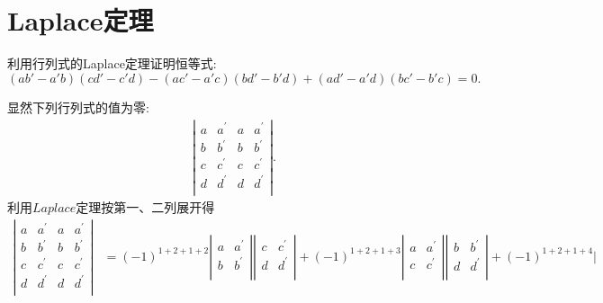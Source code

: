 \documentclass[../../main.tex]{subfiles}
\begin{document}
\section{Laplace定理}

\begin{example}
利用行列式的Laplace定理证明恒等式:
\[
(ab' - a'b)(cd' - c'd)-(ac' - a'c)(bd' - b'd)+(ad' - a'd)(bc' - b'c)=0.
\]
\end{example}
\begin{solution}
显然下列行列式的值为零:
\begin{align*}
\left| \begin{matrix}
a&		a^{\prime}&		a&		a^{\prime}\\
b&		b^{\prime}&		b&		b^{\prime}\\
c&		c^{\prime}&		c&		c^{\prime}\\
d&		d^{\prime}&		d&		d^{\prime}\\
\end{matrix} \right|.
\end{align*}
利用$Laplace$定理按第一、二列展开得
\begin{align*}
\left| \begin{matrix}
a&		a^{\prime}&		a&		a^{\prime}\\
b&		b^{\prime}&		b&		b^{\prime}\\
c&		c^{\prime}&		c&		c^{\prime}\\
d&		d^{\prime}&		d&		d^{\prime}\\
\end{matrix} \right|&=\left( -1 \right) ^{1+2+1+2}\left| \begin{matrix}
a&		a^{\prime}\\
b&		b^{\prime}\\
\end{matrix} \right|\left| \begin{matrix}
c&		c^{\prime}\\
d&		d^{\prime}\\
\end{matrix} \right|+\left( -1 \right) ^{1+2+1+3}\left| \begin{matrix}
a&		a^{\prime}\\
c&		c^{\prime}\\
\end{matrix} \right|\left| \begin{matrix}
b&		b^{\prime}\\
d&		d^{\prime}\\
\end{matrix} \right|+\left( -1 \right) ^{1+2+1+4}\left| \begin{matrix}

\end{matrix}
\end{align*}
\end{solution}
\end{document}
